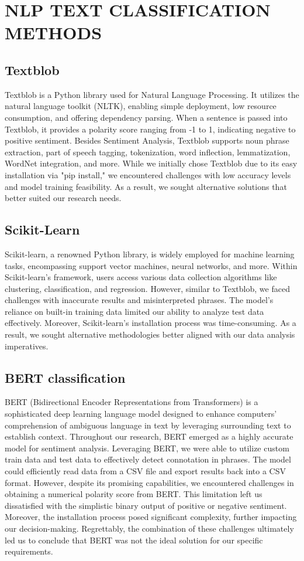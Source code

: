 \documentclass[letterpaper, 12 pt, conference]{ieeeconf}
\begin{document}
\section{NLP TEXT CLASSIFICATION METHODS}

\subsection{Textblob}
Textblob is a Python library used for Natural Language Processing. It utilizes the natural language toolkit (NLTK), enabling simple deployment, low resource consumption, and offering dependency parsing. When a sentence is passed into Textblob, it provides a polarity score ranging from -1 to 1, indicating negative to positive sentiment. Besides Sentiment Analysis, Textblob supports noun phrase extraction, part of speech tagging, tokenization, word inflection, lemmatization, WordNet integration, and more. While we initially chose Textblob due to its easy installation via "pip install," we encountered challenges with low accuracy levels and model training feasibility. As a result, we sought alternative solutions that better suited our research needs.

\subsection{Scikit-Learn}
Scikit-learn, a renowned Python library, is widely employed for machine learning tasks, encompassing support vector machines, neural networks, and more. Within Scikit-learn's framework, users access various data collection algorithms like clustering, classification, and regression. However, similar to Textblob, we faced challenges with inaccurate results and misinterpreted phrases. The model's reliance on built-in training data limited our ability to analyze test data effectively. Moreover, Scikit-learn's installation process was time-consuming. As a result, we sought alternative methodologies better aligned with our data analysis imperatives.


\subsection{BERT classification}
BERT (Bidirectional Encoder Representations from Transformers) is a sophisticated deep learning language model designed to enhance computers' comprehension of ambiguous language in text by leveraging surrounding text to establish context. Throughout our research, BERT emerged as a highly accurate model for sentiment analysis. Leveraging BERT, we were able to utilize custom train data and test data to effectively detect connotation in phrases. The model could efficiently read data from a CSV file and export results back into a CSV format. However, despite its promising capabilities, we encountered challenges in obtaining a numerical polarity score from BERT. This limitation left us dissatisfied with the simplistic binary output of positive or negative sentiment. Moreover, the installation process posed significant complexity, further impacting our decision-making. Regrettably, the combination of these challenges ultimately led us to conclude that BERT was not the ideal solution for our specific requirements.
\end{document}
